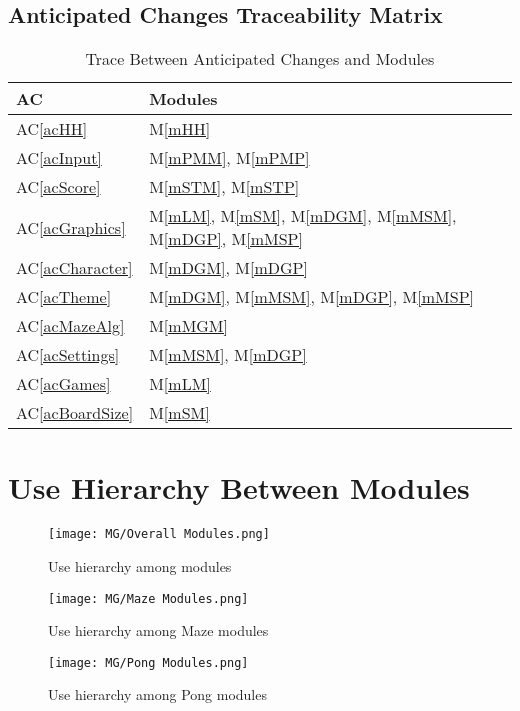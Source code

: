 \documentclass[12pt, titlepage]{article}
\newcommand{\acref}[1]{AC\ref{#1}}
\newcommand{\mref}[1]{M\ref{#1}}
\begin{document}
\subsection{Anticipated Changes Traceability Matrix}
\begin{table}[H]
\centering
\begin{tabular}{p{} p{}}
\toprule
\textbf{AC} & \textbf{Modules}\\
\midrule
\acref{acHH} & \mref{mHH}\\
\acref{acInput} & \mref{mPMM}, \mref{mPMP}\\
\acref{acScore} & \mref{mSTM}, \mref{mSTP}\\
\acref{acGraphics} & \mref{mLM}, \mref{mSM}, \mref{mDGM}, \mref{mMSM}, \mref{mDGP}, \mref{mMSP}\\
\acref{acCharacter} & \mref{mDGM}, \mref{mDGP}\\
\acref{acTheme} & \mref{mDGM}, \mref{mMSM}, \mref{mDGP}, \mref{mMSP}\\
\acref{acMazeAlg} & \mref{mMGM}\\
\acref{acSettings} & \mref{mMSM}, \mref{mDGP}\\
\acref{acGames} & \mref{mLM}\\
\acref{acBoardSize} & \mref{mSM}\\
\bottomrule
\end{tabular}
\caption{Trace Between Anticipated Changes and Modules}
\label{TblACT}
\end{table}
\newpage

\section{Use Hierarchy Between Modules} \label{SecUse}

\begin{figure}[H]
\centering
\texttt{[image: MG/Overall Modules.png]}
\caption{Use hierarchy among modules}
\label{FigUH}
\end{figure}{}

\begin{figure}[H]
\centering
\texttt{[image: MG/Maze Modules.png]}
\caption{Use hierarchy among Maze modules}
\label{FigUHM}
\end{figure}

\begin{figure}[H]
\centering
\texttt{[image: MG/Pong Modules.png]}
\caption{Use hierarchy among Pong modules}
\label{FigUHP}
\end{figure}
\end{document}

